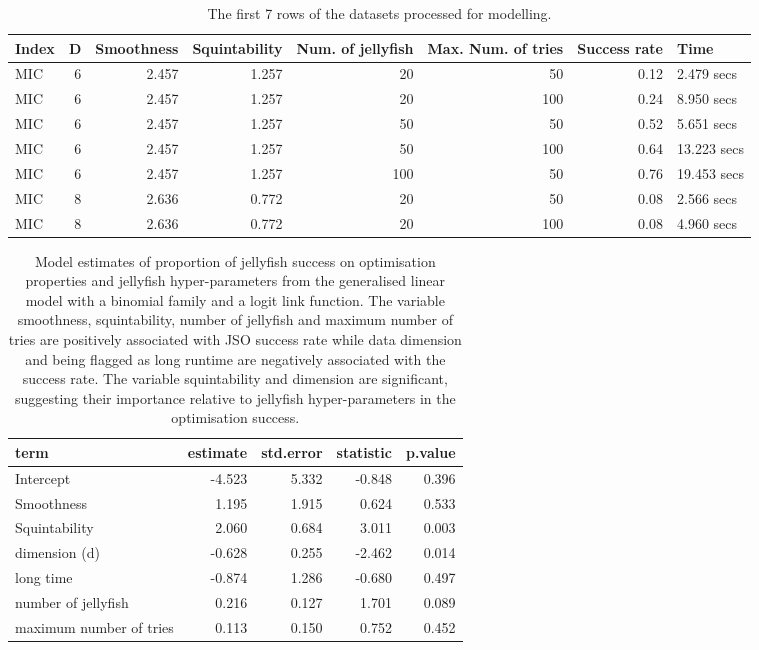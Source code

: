 \documentclass[
  number,
  preprint,
  3p]{elsarticle}
\begin{document}
\begingroup\fontsize{7}{9}\selectfont

\begin{longtable}[t]{lrrrrrrl}

\caption{\label{tbl-mod-data}The first 7 rows of the datasets processed
for modelling.}

\tabularnewline

\toprule
Index & D & Smoothness & Squintability & Num. of jellyfish & Max. Num. of tries & Success rate & Time\\
\midrule
MIC & 6 & 2.457 & 1.257 & 20 & 50 & 0.12 & 2.479 secs\\
MIC & 6 & 2.457 & 1.257 & 20 & 100 & 0.24 & 8.950 secs\\
MIC & 6 & 2.457 & 1.257 & 50 & 50 & 0.52 & 5.651 secs\\
MIC & 6 & 2.457 & 1.257 & 50 & 100 & 0.64 & 13.223 secs\\
MIC & 6 & 2.457 & 1.257 & 100 & 50 & 0.76 & 19.453 secs\\
\addlinespace
MIC & 8 & 2.636 & 0.772 & 20 & 50 & 0.08 & 2.566 secs\\
MIC & 8 & 2.636 & 0.772 & 20 & 100 & 0.08 & 4.960 secs\\
\bottomrule

\end{longtable}

\endgroup{}

\begingroup\fontsize{7}{9}\selectfont

\begin{longtable}[t]{|>{}lrrr>{}r|}

\caption{\label{tbl-mod-output}Model estimates of proportion of
jellyfish success on optimisation properties and jellyfish
hyper-parameters from the generalised linear model with a binomial
family and a logit link function. The variable smoothness,
squintability, number of jellyfish and maximum number of tries are
positively associated with JSO success rate while data dimension and
being flagged as long runtime are negatively associated with the success
rate. The variable squintability and dimension are significant,
suggesting their importance relative to jellyfish hyper-parameters in
the optimisation success.}

\tabularnewline

\toprule
term & estimate & std.error & statistic & p.value\\
\midrule
Intercept & -4.523 & 5.332 & -0.848 & 0.396\\
Smoothness & 1.195 & 1.915 & 0.624 & 0.533\\
Squintability & 2.060 & 0.684 & 3.011 & 0.003\\
dimension (d) & -0.628 & 0.255 & -2.462 & 0.014\\
long time & -0.874 & 1.286 & -0.680 & 0.497\\
\addlinespace
number of jellyfish & 0.216 & 0.127 & 1.701 & 0.089\\
maximum number of tries & 0.113 & 0.150 & 0.752 & 0.452\\
\bottomrule

\end{longtable}
\end{document}
